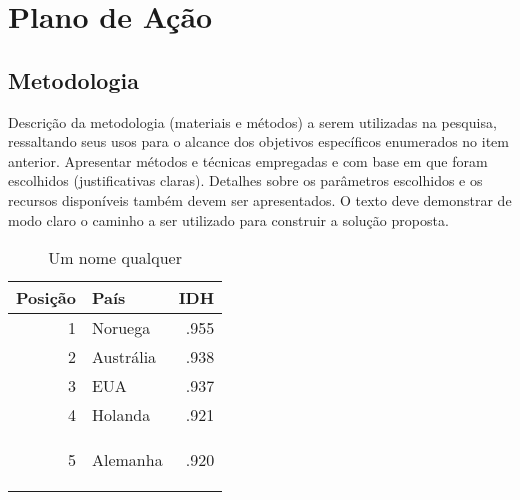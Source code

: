 %
%

\chapter{Plano de A\c{c}\~{a}o}
\lipsum[1]

\section{Metodologia}
\textcolor{RedOrange}{Descrição da metodologia (materiais e métodos) a serem utilizadas na pesquisa, ressaltando seus usos para o alcance dos objetivos específicos enumerados no item anterior. Apresentar métodos e técnicas empregadas e com base em que foram escolhidos (justificativas claras). Detalhes sobre os parâmetros escolhidos e os recursos disponíveis também devem ser apresentados. O texto deve demonstrar de modo claro o caminho a ser utilizado para construir a solução proposta.}

\lipsum[11]


\begin{table}[h]
\centering
\caption{Um nome qualquer}
\vspace{0.5cm}
\begin{tabular}{r|lr}
 
Posi\c{c}\~ao & Pa\'is & IDH \\ %
\hline                               %
1 & Noruega        & .955 \\
2 & Austr{\'a}lia  & .938 \\
3 & EUA            & .937 \\
4 & Holanda        & .921 \\
5 & Alemanha       & .920            %
 
\label{tab:tabela1}
\end{tabular}
\end{table}

